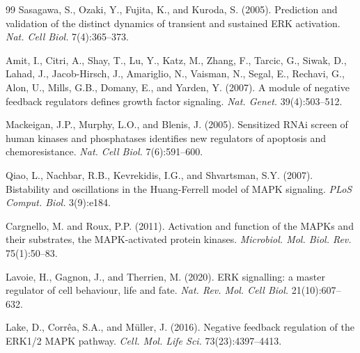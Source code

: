 \documentclass[twocolumn,11pt]{article}
\begin{document}
\begin{thebibliography}{99}
Sasagawa, S., Ozaki, Y., Fujita, K., and Kuroda, S. (2005).
\newblock Prediction and validation of the distinct dynamics of transient and sustained ERK activation.
\newblock \textit{Nat. Cell Biol.} 7(4):365--373.

Amit, I., Citri, A., Shay, T., Lu, Y., Katz, M., Zhang, F., Tarcic, G., Siwak, D., Lahad, J., Jacob-Hirsch, J., Amariglio, N., Vaisman, N., Segal, E., Rechavi, G., Alon, U., Mills, G.B., Domany, E., and Yarden, Y. (2007).
\newblock A module of negative feedback regulators defines growth factor signaling.
\newblock \textit{Nat. Genet.} 39(4):503--512.

Mackeigan, J.P., Murphy, L.O., and Blenis, J. (2005).
\newblock Sensitized RNAi screen of human kinases and phosphatases identifies new regulators of apoptosis and chemoresistance.
\newblock \textit{Nat. Cell Biol.} 7(6):591--600.

Qiao, L., Nachbar, R.B., Kevrekidis, I.G., and Shvartsman, S.Y. (2007).
\newblock Bistability and oscillations in the Huang-Ferrell model of MAPK signaling.
\newblock \textit{PLoS Comput. Biol.} 3(9):e184.

Cargnello, M. and Roux, P.P. (2011).
\newblock Activation and function of the MAPKs and their substrates, the MAPK-activated protein kinases.
\newblock \textit{Microbiol. Mol. Biol. Rev.} 75(1):50--83.

Lavoie, H., Gagnon, J., and Therrien, M. (2020).
\newblock ERK signalling: a master regulator of cell behaviour, life and fate.
\newblock \textit{Nat. Rev. Mol. Cell Biol.} 21(10):607--632.

Lake, D., Corrêa, S.A., and Müller, J. (2016).
\newblock Negative feedback regulation of the ERK1/2 MAPK pathway.
\newblock \textit{Cell. Mol. Life Sci.} 73(23):4397--4413.

\end{thebibliography}
\end{document}
